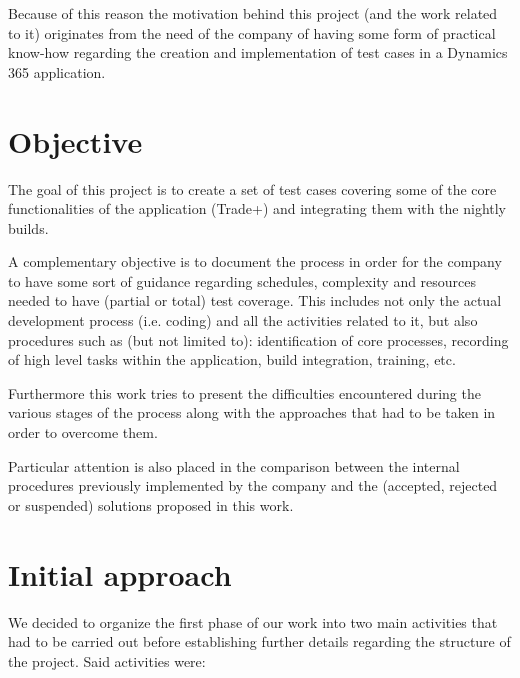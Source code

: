 Because of this reason the motivation behind this project (and the work related to it) originates from the need of the company of having some form of practical know-how regarding the creation and implementation of test cases in a Dynamics 365 application.

\section{Objective} 

The goal of this project is to create a set of test cases covering some of the core functionalities of the application (Trade+) and integrating them with the nightly builds.

A complementary objective is to document the process in order for the company to have some sort of guidance regarding schedules, complexity and resources needed to have (partial or total) test coverage. 
This includes not only the actual development process (i.e. coding) and all the activities related to it, but also procedures such as (but not limited to): identification of core processes, recording of high level tasks within the application, build integration, training, etc.

Furthermore this work tries to present the difficulties encountered during the various stages of the process along with the approaches that had to be taken in order to overcome them.

Particular attention is also placed in the comparison between the internal procedures previously implemented by the company and the (accepted, rejected or suspended) solutions proposed in this work.

\section{Initial approach}

We decided to organize the first phase of our work into two main activities that had to be carried out before establishing further details regarding the structure of the project. Said activities were:

